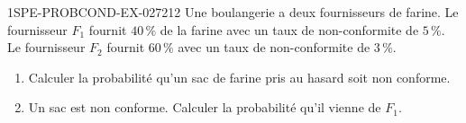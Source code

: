 \begin{exercice}{1SPE-PROBCOND-EX-027}{2}{12}
Une boulangerie a deux fournisseurs de farine. Le fournisseur $F_1$ fournit $40\,\%$ de la farine avec un taux de non-conformite de $5\,\%$. Le fournisseur $F_2$ fournit $60\,\%$ avec un taux de non-conformite de $3\,\%$.

\begin{enumerate}
  \item Calculer la probabilité qu'un sac de farine pris au hasard soit non conforme.
  \item Un sac est non conforme. Calculer la probabilité qu'il vienne de $F_1$.
\end{enumerate}
\end{exercice}
